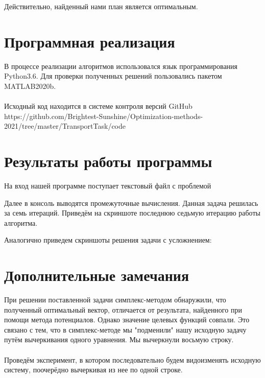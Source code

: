 \documentclass{article}
\begin{document}
\noindent Действительно, найденный нами план является оптимальным.

\section{Программная реализация}
\noindent В процессе реализации алгоритмов использовался язык программирования Python3.6. Для проверки полученных решений пользовались пакетом MATLAB2020b.
\\\\
\noindent Исходный код находится в системе контроля версий GitHub 
\\
https://github.com/Brightest-Sunshine/Optimization-methods-2021/tree/master/TransportTask/code


\section{Результаты работы программы}
\noindent На вход нашей программе поступает текстовый файл с проблемой
\begin{figure}[H]
\label{fig:image}
\end{figure}
\noindent Далее в консоль выводятся промежуточные вычисления. Данная задача решилась за семь итераций. Приведём на скриншоте последнюю седьмую итерацию работы алгоритма.
\begin{figure}[H]
\label{fig:image}
\end{figure}

\noindent Аналогично приведем скриншоты решения задачи с усложнением:
\begin{figure}[H]
\label{fig:image}
\end{figure}
\begin{figure}[H]
\label{fig:image}
\end{figure}

\section{Дополнительные замечания}
\noindent При решении поставленной задачи симплекс-методом обнаружили, что полученный оптимальный вектор, отличается от результата, найденного при помощи метода потенциалов. Однако значение целевых функций совпали. Это связано с тем, что в симплекс-методе мы "подменили" нашу исходную задачу путём вычеркивания одного уравнения. Мы вычеркнули восьмую строку. 
\\\\
\noindent Проведём эксперимент, в котором последовательно будем видоизменять исходную систему, поочерёдно вычеркивая из нее по одной строке.
\end{document}
